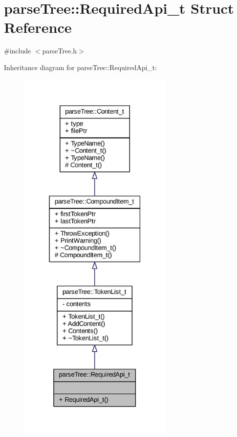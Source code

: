 \hypertarget{structparse_tree_1_1_required_api__t}{}\section{parse\+Tree\+:\+:Required\+Api\+\_\+t Struct Reference}
\label{structparse_tree_1_1_required_api__t}


{\ttfamily \#include $<$parse\+Tree.\+h$>$}



Inheritance diagram for parse\+Tree\+:\+:Required\+Api\+\_\+t\+:
\nopagebreak
\begin{figure}[H]
\begin{center}
\leavevmode
\includegraphics[width=219pt]{structparse_tree_1_1_required_api__t__inherit__graph}
\end{center}
\end{figure}


